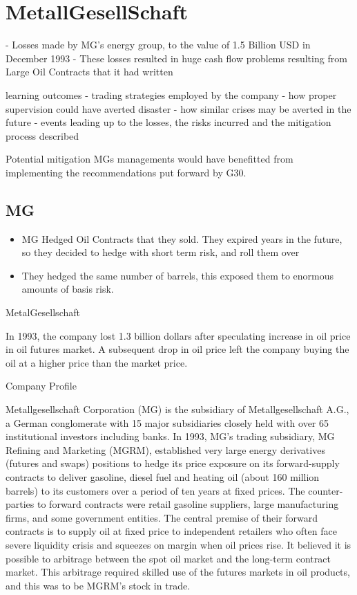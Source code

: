 
\section{MetallGesellSchaft}

- Losses made by MG's energy group, to the value of 1.5 Billion USD in December 1993
- These losses resulted in huge cash flow problems resulting from Large Oil Contracts that it had written

learning outcomes
 - trading strategies employed by the company
 - how proper supervision could have averted disaster
 - how similar crises may be averted in the future
 - events leading up to the losses, the risks incurred and the mitigation process described

Potential mitigation
MGs managements would have benefitted from implementing the recommendations put forward by G30.

\subsection{MG}

\begin{itemize}
\item MG Hedged Oil Contracts that they sold. They expired years in the future, so they decided to hedge with short term risk, and roll them over
\item They hedged the same number of barrels, this exposed them to enormous amounts of basis risk.
\end{itemize}


\newpage
MetalGesellschaft


In 1993, the company lost 1.3 billion dollars after speculating increase in oil price in oil futures market. A subsequent drop in oil price left the company buying the oil at a higher price than the market price. 
 



Company Profile

Metallgesellschaft Corporation (MG) is the subsidiary of Metallgesellschaft A.G., a German conglomerate with 15 major subsidiaries closely held with over 65%
institutional investors including banks.  In 1993, MG’s trading subsidiary, MG Refining and Marketing (MGRM), established very large energy derivatives  (futures and swaps) positions to
hedge its price exposure on its forward-supply contracts to deliver gasoline, diesel fuel and heating oil (about 160 million barrels) to its customers over a period of ten years at fixed prices. The counter-parties to forward contracts were retail gasoline suppliers, large manufacturing firms, and some government entities.  The central premise of their forward contracts is to supply oil at fixed price to independent retailers who often face severe liquidity crisis and squeezes on margin when oil prices rise.  It believed it is possible to arbitrage between the spot oil market and the long-term contract market.  This arbitrage required skilled use of the futures markets in oil products, and this was to be MGRM’s stock in trade.

